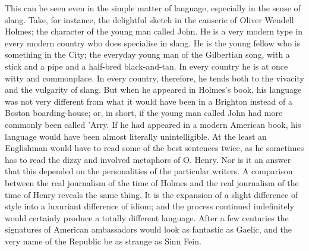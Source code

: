 \documentclass{book}
\begin{document}
This can be seen even in the simple matter of language, especially in the sense of slang. Take, for instance, the delightful sketch in the causerie of Oliver Wendell Holmes; the character of the young man called John. He is a very modern type in every modern country who does specialise in slang. He is the young fellow who is something in the City; the everyday young man of the Gilbertian song, with a stick and a pipe and a half-bred black-and-tan. In every country he is at once witty and commonplace. In every country, therefore, he tends both to the vivacity and the vulgarity of slang. But when he appeared in Holmes’s book, his language was not very different from what it would have been in a Brighton instead of a Boston boarding-house; or, in short, if the young man called John had more commonly been called ’Arry. If he had appeared in a modern American book, his language would have been almost literally unintelligible. At the least an Englishman would have to read some of the best sentences twice, as he sometimes has to read the dizzy and involved metaphors of O. Henry. Nor is it an answer that this depended on the personalities of the particular writers. A comparison between the real journalism of the time of Holmes and the real journalism of the time of Henry reveals the same thing. It is the expansion of a slight difference of style into a luxuriant difference of idiom; and the process continued indefinitely would certainly produce a totally different language. After a few centuries the signatures of American ambassadors would look as fantastic as Gaelic, and the very name of the Republic be as strange as Sinn Fein.
\end{document}
